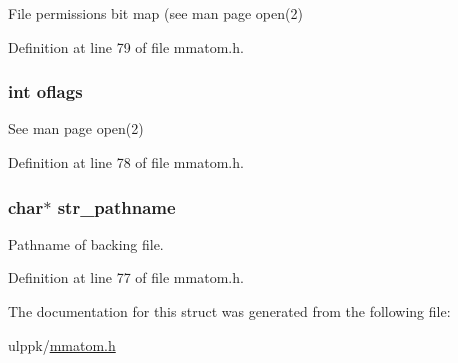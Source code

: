 File permissions bit map (see man page open(2) 



Definition at line 79 of file mmatom.\-h.

\hypertarget{struct_m_m_a___d_i_s_k___f_i_l_e___r_e_f_ad059e7b9fff7394a6042adf9bcc062ed}{
\subsubsection[{oflags}]{\setlength{\rightskip}{0pt plus 5cm}int oflags}}\label{struct_m_m_a___d_i_s_k___f_i_l_e___r_e_f_ad059e7b9fff7394a6042adf9bcc062ed}


See man page open(2) 



Definition at line 78 of file mmatom.\-h.

\hypertarget{struct_m_m_a___d_i_s_k___f_i_l_e___r_e_f_a1b3bbe6b0268b428c4fbd43e04c30e1a}{
\subsubsection[{str\-\_\-pathname}]{\setlength{\rightskip}{0pt plus 5cm}char$\ast$ str\-\_\-pathname}}\label{struct_m_m_a___d_i_s_k___f_i_l_e___r_e_f_a1b3bbe6b0268b428c4fbd43e04c30e1a}


Pathname of backing file. 



Definition at line 77 of file mmatom.\-h.



The documentation for this struct was generated from the following file\-:\begin{DoxyCompactItemize}
\item 
ulppk/\hyperlink{mmatom_8h}{mmatom.\-h}\end{DoxyCompactItemize}
